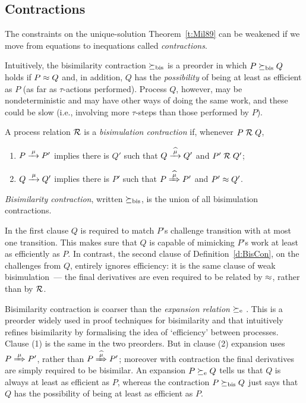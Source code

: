 \subsection{Contractions}
\label{s:mcontr}

The constraints on the unique-solution Theorem~\ref{t:Mil89} can be 
weakened if  we move from equations to inequations called
  \emph{contractions}.


  Intuitively,
  the bisimilarity contraction 
$\mathrel{\succeq_{\rm{bis}}}$ 
 is  a preorder in which 
$P \mathrel{\succeq_{\rm{bis}}} Q  $  holds  if $P \approx Q$ and, in addition, 
$Q$ has the \emph{possibility} of being at least as efficient as $P$ (as far as
$\tau$-actions performed). 
Process $Q$, however, may be nondeterministic and may have other ways
of doing the same work, and these could be  slow (i.e., involving
more $\tau$-steps than those performed by $P$).

\begin{definition}%
\label{d:BisCon}
A process relation ${{\cal R}}$ 
 is a {\em  bisimulation  contraction}  if, whenever
 $P\mathrel{\cal R} Q$, %

\begin{enumerate}
\item   $P \arr\mu P'$ implies there is $Q'$ such that $Q \arcap \mu
  Q'$
 and $P' \mathrel{\cal R} Q'$;

\item 
    $Q \arr\mu Q'$   implies there is $P'$ such that $P \Arcap \mu
 P'$ and $P' 
\approx Q'$.
\end{enumerate}
\emph{Bisimilarity  contraction}, written $\mathrel{\succeq_{\rm{bis}}}$, is the union
of all bisimulation contractions. 
\end{definition}

In the first clause $Q$ is required to match $P$'s challenge
transition with at most one transition.
This makes sure that $Q$ is capable of mimicking $P$'s
work at least as efficiently as $P$. 
In contrast, the second clause of Definition~\ref{d:BisCon}, on the
challenges from $Q$, entirely ignores efficiency: it is the same
clause of  weak bisimulation~--- the final derivatives are even required
to be related  by $\approx$, rather than by ${\cal R}$.
 

Bisimilarity  contraction is coarser than 
 the \emph{expansion relation} 
$\mathrel{\succeq_{\rm{e}}}$ \cite{sangiorgi2015equations,arun1992efficiency}.
This is a
preorder widely used in proof techniques for bisimilarity and that 
intuitively refines bisimilarity by 
 formalising the idea of `efficiency' between processes.
Clause (1) is the same in the two
preorders. But in clause (2) expansion uses 
$P \Arr \mu P'$, rather than $P \Arcap \mu P'$; 
 moreover with
contraction the final derivatives are simply required to be bisimilar.
An expansion 
$P \mathrel{\succeq_{\rm{e}}} Q$
tells us  that $Q$ is always at least as efficient as $P$, whereas  the
 contraction $P \mathrel{\succeq_{\rm{bis}}} Q$  just says that $Q$ has the  possibility of
being at least as efficient as $P$. 

